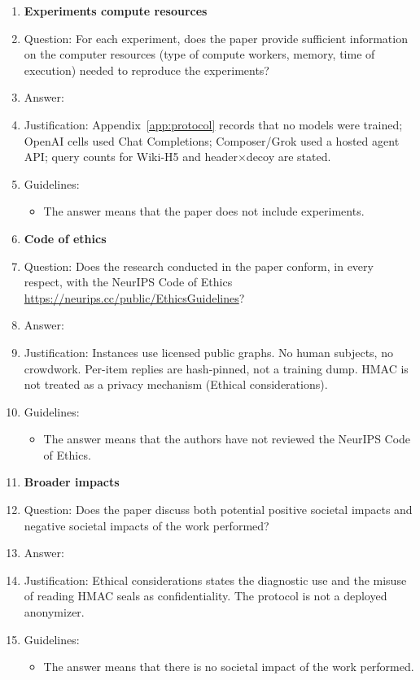 \begin{enumerate}
\item {\bf Experiments compute resources}
\item[] Question: For each experiment, does the paper provide sufficient information on the computer resources (type of compute workers, memory, time of execution) needed to reproduce the experiments?
\item[] Answer: \answerYes{}
\item[] Justification: Appendix~\ref{app:protocol} records that no models were trained; OpenAI cells used Chat Completions; Composer/Grok used a hosted agent API; query counts for Wiki-H5 and header$\times$decoy are stated.
\item[] Guidelines:
\begin{itemize}
\item The answer \answerNA{} means that the paper does not include experiments.
\end{itemize}

\item {\bf Code of ethics}
\item[] Question: Does the research conducted in the paper conform, in every respect, with the NeurIPS Code of Ethics \url{https://neurips.cc/public/EthicsGuidelines}?
\item[] Answer: \answerYes{}
\item[] Justification: Instances use licensed public graphs. No human subjects, no crowdwork. Per-item replies are hash-pinned, not a training dump. HMAC is not treated as a privacy mechanism (Ethical considerations).
\item[] Guidelines:
\begin{itemize}
\item The answer \answerNA{} means that the authors have not reviewed the NeurIPS Code of Ethics.
\end{itemize}

\item {\bf Broader impacts}
\item[] Question: Does the paper discuss both potential positive societal impacts and negative societal impacts of the work performed?
\item[] Answer: \answerYes{}
\item[] Justification: Ethical considerations states the diagnostic use and the misuse of reading HMAC seals as confidentiality. The protocol is not a deployed anonymizer.
\item[] Guidelines:
\begin{itemize}
\item The answer \answerNA{} means that there is no societal impact of the work performed.
\end{itemize}


\end{enumerate}
